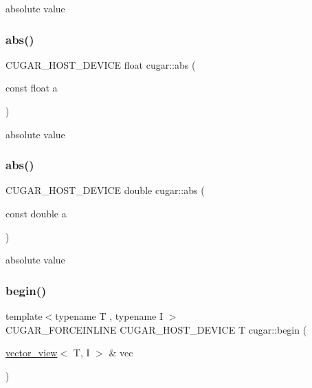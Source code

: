 absolute value \mbox{\label{group___basic_gaa2016bab6ca9f9043a7251b64daa0941}} 
\subsubsection{\texorpdfstring{abs()}{abs()}\hspace{0.1cm}{\footnotesize\ttfamily [3/4]}}
{\footnotesize\ttfamily C\+U\+G\+A\+R\+\_\+\+H\+O\+S\+T\+\_\+\+D\+E\+V\+I\+CE float cugar\+::abs (\begin{DoxyParamCaption}\item[{const float}]{a }\end{DoxyParamCaption})\hspace{0.3cm}{\ttfamily [inline]}}

absolute value \mbox{\label{group___basic_ga6f625f0822c168a5fbea5dccd0a515fc}} 
\subsubsection{\texorpdfstring{abs()}{abs()}\hspace{0.1cm}{\footnotesize\ttfamily [4/4]}}
{\footnotesize\ttfamily C\+U\+G\+A\+R\+\_\+\+H\+O\+S\+T\+\_\+\+D\+E\+V\+I\+CE double cugar\+::abs (\begin{DoxyParamCaption}\item[{const double}]{a }\end{DoxyParamCaption})\hspace{0.3cm}{\ttfamily [inline]}}

absolute value \mbox{\label{group___basic_ga7a37aba0ec0ff22738563bca83609dca}} 
\subsubsection{\texorpdfstring{begin()}{begin()}\hspace{0.1cm}{\footnotesize\ttfamily [1/4]}}
{\footnotesize\ttfamily template$<$typename T , typename I $>$ \\
C\+U\+G\+A\+R\+\_\+\+F\+O\+R\+C\+E\+I\+N\+L\+I\+NE C\+U\+G\+A\+R\+\_\+\+H\+O\+S\+T\+\_\+\+D\+E\+V\+I\+CE T cugar\+::begin (\begin{DoxyParamCaption}\item[{\hyperlink{structcugar_1_1vector__view}{vector\+\_\+view}$<$ T, I $>$ \&}]{vec }\end{DoxyParamCaption})}

